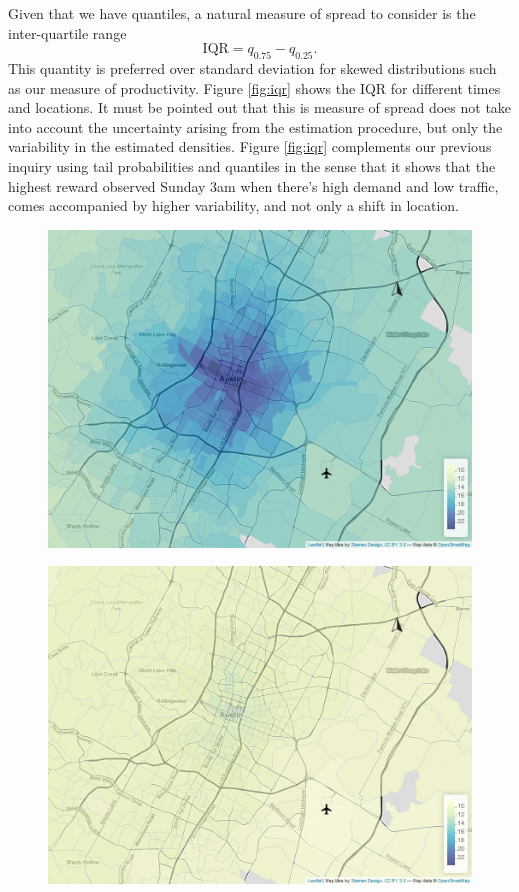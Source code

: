 \documentclass[a4paper, 11pt]{article}
\begin{document}
Given that we have quantiles, a natural measure of spread to consider is the inter-quartile range
$$
\text{IQR} = q_{0.75} - q_{0.25}.
$$
This quantity is preferred over standard deviation for skewed distributions such as our measure of productivity. Figure \ref{fig:iqr} shows the IQR for different times and locations. It must be pointed out that this is measure of spread does not take into account the uncertainty arising from the estimation procedure, but only the variability in the estimated densities. Figure \ref{fig:iqr} complements our previous inquiry using tail probabilities and quantiles in the sense that it shows that the highest reward observed Sunday 3am when there's high demand and low traffic, comes accompanied by higher variability, and not only a shift in location.

\begin{figure}[tb]
    \centering
    \begin{minipage}[tb]{0.48\linewidth}
        \centering
        \includegraphics[width=\linewidth]{img/quantile_9_1.png}
        \label{fig:iqr:a}
    \end{minipage}
    \begin{minipage}[tb]{0.48\linewidth}
        \centering
        \includegraphics[width=\linewidth]{img/quantile_43_1.png}

\end{minipage}
\end{figure}
\end{document}
